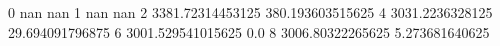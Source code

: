 0 nan nan
1 nan nan
2 3381.72314453125 380.193603515625
4 3031.2236328125 29.694091796875
6 3001.529541015625 0.0
8 3006.80322265625 5.273681640625
